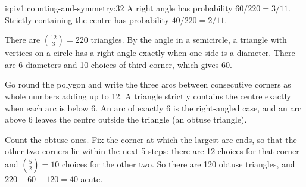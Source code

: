 \begin{solution}{iq:iv1:counting-and-symmetry:32}
A right angle has probability $60/220 = 3/11$. Strictly containing the centre has probability $40/220 = 2/11$.

There are $\binom{12}{3} = 220$ triangles. By the angle in a semicircle, a triangle with vertices on a circle has a right angle exactly when one side is a diameter. There are 6 diameters and 10 choices of third corner, which gives 60.

Go round the polygon and write the three arcs between consecutive corners as whole numbers adding up to 12. A triangle strictly contains the centre exactly when each arc is below 6. An arc of exactly 6 is the right-angled case, and an arc above 6 leaves the centre outside the triangle (an obtuse triangle).

Count the obtuse ones. Fix the corner at which the largest arc ends, so that the other two corners lie within the next 5 steps: there are 12 choices for that corner and $\binom{5}{2} = 10$ choices for the other two. So there are 120 obtuse triangles, and $220 - 60 - 120 = 40$ acute.

\end{solution}


